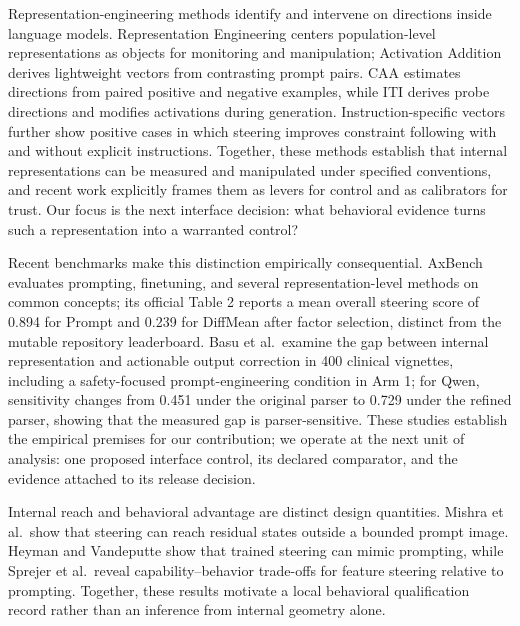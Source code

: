 \documentclass[manuscript,review,anonymous]{acmart}
\begin{document}
Representation-engineering methods identify and intervene on directions inside language models. Representation Engineering centers population-level representations as objects for monitoring and manipulation; Activation Addition derives lightweight vectors from contrasting prompt pairs. \cite{zou2023repe,turner2023actadd} CAA estimates directions from paired positive and negative examples, while ITI derives probe directions and modifies activations during generation. \cite{rimsky2024caa,li2023iti} Instruction-specific vectors further show positive cases in which steering improves constraint following with and without explicit instructions. \cite{stolfo2025instr} {}%
Together, these methods establish that internal representations can be measured and manipulated under specified conventions, and recent work explicitly frames them as levers for control and as calibrators for trust. \cite{subramani2026latent} Our focus is the next interface decision: what behavioral evidence turns such a representation into a warranted control?

Recent benchmarks make this distinction empirically consequential. AxBench evaluates prompting, finetuning, and several representation-level methods on common concepts; its official Table 2 reports a mean overall steering score of 0.894 for Prompt and 0.239 for DiffMean after factor selection, distinct from the mutable repository leaderboard. \cite{wu2025axbench} {}%
Basu et al.~examine the gap between internal representation and actionable output correction in 400 clinical vignettes, including a safety-focused prompt-engineering condition in Arm 1; for Qwen, sensitivity changes from 0.451 under the original parser to 0.729 under the refined parser, showing that the measured gap is parser-sensitive. \cite{basu2026actionability} {}%
These studies establish the empirical premises for our contribution; we operate at the next unit of analysis: one proposed interface control, its declared comparator, and the evidence attached to its release decision.

Internal reach and behavioral advantage are distinct design quantities. Mishra et al.~show that steering can reach residual states outside a bounded prompt image. \cite{mishra2026nonsurj} Heyman and Vandeputte show that trained steering can mimic prompting, while Sprejer et al.~reveal capability--behavior trade-offs for feature steering relative to prompting. \cite{heyman2026steer,sprejer2026mindgap} Together, these results motivate a local behavioral qualification record rather than an inference from internal geometry alone.
\end{document}
